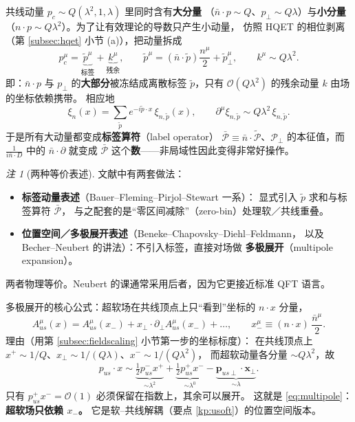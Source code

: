 \documentclass[UTF8,a4paper,11pt]{ctexart}
\theoremstyle{definition}
\theoremstyle{remark}
\newtheorem{remark}{注}[section]
\theoremstyle{plain}
\newcommand{\en}[1]{\textsf{#1}}   %
\begin{document}
共线动量 $p_c\sim Q(\lambda^2,1,\lambda)$ 里同时含有\textbf{大分量}
（$\bar n\cdot p\sim Q$、$p_\perp\sim Q\lambda$）与\textbf{小分量}
（$n\cdot p\sim Q\lambda^2$）。为了让有效理论的导数只产生小动量，
仿照 HQET 的相位剥离（第 \ref{subsec:hqet} 小节 (a)），把动量拆成
\begin{equation}
  p_c^\mu=\underbrace{\tilde p^\mu}_{\text{标签}}+\underbrace{k^\mu}_{\text{残余}},
  \qquad
  \tilde p^\mu=(\bar n\cdot\tilde p)\frac{n^\mu}{2}+\tilde p_\perp^\mu,
  \qquad
  k^\mu\sim Q\lambda^2 .
  \label{eq:labelmom}
\end{equation}
即：$\bar n\cdot p$ 与 $p_\perp$ 的\textbf{大部分}被冻结成离散标签
$\tilde p$，只有 $\mathcal O(Q\lambda^2)$ 的残余动量 $k$ 由场的坐标依赖携带。
相应地
\begin{equation}
  \xi_n(x)=\sum_{\tilde p}e^{-i\tilde p\cdot x}\,\xi_{n,\tilde p}(x),
  \qquad
  \partial^\mu\xi_{n,\tilde p}\sim Q\lambda^2\,\xi_{n,\tilde p} .
  \label{eq:labelfield}
\end{equation}
于是所有大动量都变成\textbf{标签算符}（\en{label operator}）
$\bar{\mathcal P}\equiv\bar n\cdot\tilde{\mathcal P}$、$\mathcal P_\perp$
的本征值，而 $\frac{1}{i\bar n\cdot D}$ 中的 $\bar n\cdot\partial$
就变成 $\bar{\mathcal P}$ 这个\textbf{数}——非局域性因此变得非常好操作。

\begin{remark}[两种等价表述]
文献中有两套做法：
\begin{itemize}
  \item \textbf{标签动量表述}（Bauer--Fleming--Pirjol--Stewart 一系）：
        显式引入 $\tilde p$ 求和与标签算符 $\bar{\mathcal P}$，
        与之配套的是“零区间减除”（\en{zero-bin}）处理软／共线重叠。
  \item \textbf{位置空间／多极展开表述}（Beneke--Chapovsky--Diehl--Feldmann，
        以及 Becher--Neubert 的讲法）：不引入标签，直接对场做
        \textbf{多极展开}（\en{multipole expansion}）。
\end{itemize}
两者物理等价。Neubert 的课通常采用后者，因为它更接近标准 QFT 语言。
\end{remark}

多极展开的核心公式：超软场在共线顶点上只“看到”坐标的 $n\cdot x$ 分量，
\begin{equation}
  A_{us}^\mu(x)
  = A_{us}^\mu(x_-)
   + x_\perp\!\cdot\!\partial_\perp A_{us}^\mu(x_-)
   + \dots ,
  \qquad
  x_-^\mu\equiv (n\cdot x)\,\frac{\bar n^\mu}{2} .
  \label{eq:multipole}
\end{equation}
理由（用第 \ref{subsec:fieldscaling} 小节第一步的坐标标度）：
在共线顶点上 $x^+\sim1/Q$、$x_\perp\sim1/(Q\lambda)$、$x^-\sim1/(Q\lambda^2)$，
而超软动量各分量 $\sim Q\lambda^2$，故
\begin{equation}
  p_{us}\cdot x \sim
  \underbrace{\tfrac12 p_{us}^-x^+}_{\sim\lambda^2}
  +\underbrace{\tfrac12 p_{us}^+x^-}_{\sim\lambda^0}
  -\underbrace{\bm p_{us\perp}\!\cdot\!\bm x_\perp}_{\sim\lambda} .
\end{equation}
只有 $p_{us}^+x^-=\mathcal O(1)$ 必须保留在指数上，其余可以展开。
这就是 \eqref{eq:multipole}：\textbf{超软场只依赖 $x_-$。}
它是软--共线解耦（要点 \ref{kp:usoft}）的位置空间版本。
\end{document}
